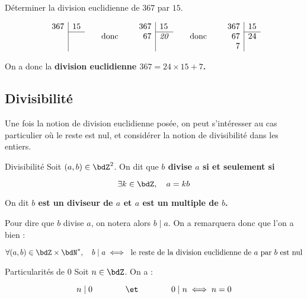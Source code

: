 \documentclass[a4paper,french,bookmarks]{article}
\begin{document}
\begin{example}{}{}
    Déterminer la division euclidienne de $367$ par $15$.
    
    \tcblower
    
    \[ \begin{array}{r|l}
        367 & 15    \\\cline{2-2}
        \textit{} &      \\
        \textit{}
    \end{array} \qquad \text{donc} \qquad \begin{array}{r|l}
        367 & 15    \\\cline{2-2}
        67 & \mathit{20}     \\
        \textit{}
    \end{array} \qquad \text{donc} \qquad \begin{array}{r|l}
        367 & 15    \\\cline{2-2}
        67 & 24     \\
        7
    \end{array} \]

    On a donc la \bf{division euclidienne $367 = 24\times15 + 7$}.
\end{example}

\subsection{Divisibilité}

Une fois la notion de division euclidienne posée, on peut s'intéresser au cas particulier où le reste est nul, et considérer la notion de divisibilité dans les entiers.

\begin{definition}{Divisibilité}{}
    Soit $(a, b) \in \bdZ^2$. On dit que \bf{$b$ divise $a$} si et seulement si
    
    \[ \exists k \in \bdZ,\quad a = kb\]
    
    On dit \bf{$b$ est un diviseur de $a$} et \bf{$a$ est un multiple de $b$}.
\end{definition}
Pour dire que $b$ divise $a$, on notera alors $b \mid a$. On a remarquera donc que l'on a bien :

\[ \forall (a, b) \in \bdZ\times\bdN^*,\quad b \mid a \iff \ \text{le reste de la division euclidienne de} \ a \ \text{par} \ b \ \text{est nul} \]

\begin{property}{Particularités de $0$}{}
    Soit $n \in \bdZ$. On a :
    
    \[ n \mid 0 \qquad\qquad\et\qquad\qquad 0 \mid n \iff n = 0\]
    
\end{property}
\end{document}
